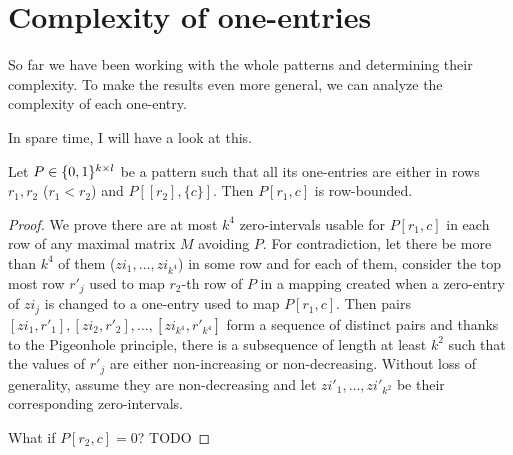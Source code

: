 \section{Complexity of one-entries}
So far we have been working with the whole patterns and determining their complexity. To make the results even more general, we can analyze the complexity of each one-entry.

In spare time, I will have a look at this. 

\begin{lemma}
\label{lemma:cross}
Let $P\in\{0,1\}^{k\times l}$ be a pattern such that all its one-entries are either in rows $r_1,r_2$ ($r_1<r_2$) and $P[[r_2],\{c\}]$. Then $P[r_1,c]$ is row-bounded.
\end{lemma}
\begin{proof}
We prove there are at most $k^4$ zero-intervals usable for $P[r_1,c]$ in each row of any maximal matrix $M$ avoiding $P$. For contradiction, let there be more than $k^4$ of them ($zi_1,\dots,zi_{k^4}$) in some row and for each of them, consider the top most row $r'_j$ used to map $r_2$-th row of $P$ in a mapping created when a zero-entry of $zi_j$ is changed to a one-entry used to map $P[r_1,c]$. Then pairs $[zi_1,r'_1],[zi_2,r'_2],\dots,[zi_{k^4},r'_{k^4}]$ form a sequence of distinct pairs and thanks to the Pigeonhole principle, there is a subsequence of length at least $k^2$ such that the values of $r'_j$ are either non-increasing or non-decreasing. Without loss of generality, assume they are non-decreasing and let $zi'_1,\dots,zi'_{k^2}$ be their corresponding zero-intervals.

What if $P[r_2,c]=0$? TODO
\end{proof}

